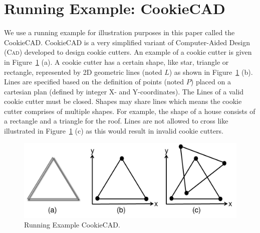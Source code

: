 \section{Running Example: CookieCAD}
\label{sec:Examples}


We use a running example for illustration purposes in this paper called the CookieCAD.
CookieCAD is a very simplified variant of Computer-Aided Design (\textsc{Cad}) developed to design cookie cutters.
An example of a cookie cutter is given in Figure~\ref{fig:CookieCAD} (a).
A cookie cutter has a certain shape, like star, triangle or rectangle, represented by 2D geometric lines (noted $L$) as shown in Figure~\ref{fig:CookieCAD} (b).
Lines are specified based on the definition of points (noted $P$) placed on a cartesian plan (defined by integer X- and Y-coordinates).
The Lines of a valid cookie cutter must be closed. 
Shapes may share lines which means the cookie cutter comprises of multiple shapes.
For example, the shape of a house consists of a rectangle and a triangle for the roof.
Lines are not allowed to cross like illustrated in Figure~\ref{fig:CookieCAD} (c) as this would result in invalid cookie cutters.

\begin{figure}[t]
\centering
\includegraphics[width=\columnwidth]{img/CookieCAD.pdf}
\caption{Running Example CookieCAD.}%
\label{fig:CookieCAD}

\end{figure}


